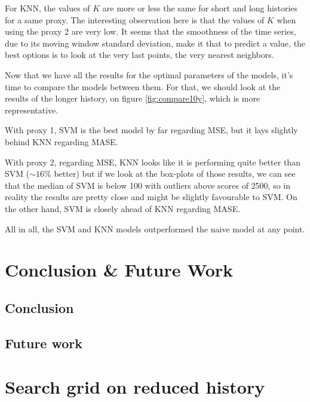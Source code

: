 \documentclass[11pt,a4paper,oneside]{book}
\begin{document}
For KNN, the values of $K$ are more or less the same for short and long histories for a same proxy. The interesting observation here is that the values of $K$ when using the proxy 2 are very low. It seems that the smoothness of the time series, due to its moving window standard deviation, make it that to predict a value, the best options is to look at the very last points, the very nearest neighbors.







Now that we have all the results for the optimal parameters of the models, it's time to compare the models between them. For that, we should look at the results of the longer history, on figure \ref{fig:compare10y}, which is more representative. 

With proxy 1, SVM is the best model by far regarding MSE, but it lays slightly behind KNN regarding MASE. 

With proxy 2, regarding MSE, KNN looks like it is performing quite better than SVM ($\sim 16\%$ better) but if we look at the box-plots of those results, we can see that the median of SVM is below 100 with outliers above scores of 2500, so in reality the results are pretty close and might be slightly favourable to SVM. On the other hand, SVM is closely ahead of KNN regarding MASE.

All in all, the SVM and KNN models outperformed the naive model at any point.




\chapter{Conclusion \& Future Work }


\section{Conclusion}


\section{Future work}




\clearpage
\appendix
\chapter{Search grid on reduced history}\label{6mapp}
\end{document}
